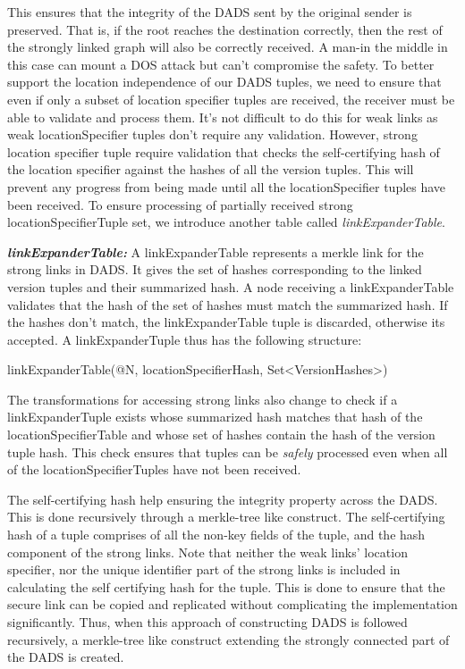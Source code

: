 This ensures that the integrity of the DADS sent by the original sender is preserved. That is, if the root reaches the destination correctly, then the rest of the strongly linked graph will also be correctly received. A man-in the middle in this case can mount a DOS attack but can't compromise the safety. To better support the location independence of our DADS tuples, we need to ensure that even if only a subset of location specifier tuples are received, the receiver must be able to validate and process them. It's not difficult to do this for weak links as weak locationSpecifier tuples don't require any validation. However, strong location specifier tuple require validation that checks the self-certifying hash of the location specifier against the hashes of all the version tuples. This will prevent any progress from being made until all the locationSpecifier tuples have been received. To ensure processing of partially received strong locationSpecifierTuple set, we introduce another table called {\em linkExpanderTable}.

\noindent\textit{\textbf{linkExpanderTable:}} A linkExpanderTable represents a merkle link for the strong links in DADS. It gives the set of hashes corresponding to the linked version tuples and their summarized hash. A node receiving a linkExpanderTable validates that the hash of the set of hashes must match the summarized hash. If the hashes don't match, the linkExpanderTable tuple is discarded, otherwise its accepted. A linkExpanderTuple thus has the following structure:

\begin{center}
linkExpanderTable(@N, locationSpecifierHash, Set<VersionHashes>)
\end{center}

The transformations for accessing strong links also change to check if a linkExpanderTuple exists whose summarized hash matches that hash of the locationSpecifierTable and whose set of hashes contain the hash of the version tuple hash. This check ensures that tuples can be {\em safely} processed even when all of the locationSpecifierTuples have not been received.

The self-certifying hash help ensuring the integrity property across the DADS. This is done recursively through a merkle-tree like construct. The self-certifying hash of a tuple comprises of all the non-key fields of the tuple, and the hash component of the strong links. Note that neither the weak links' location specifier, nor the unique identifier part of the strong links is included in calculating the self certifying hash for the tuple. This is done to ensure that the secure link can be copied and replicated without complicating the implementation significantly. Thus, when this approach of constructing DADS is followed recursively, a merkle-tree like construct extending the strongly connected part of the DADS is created. 

